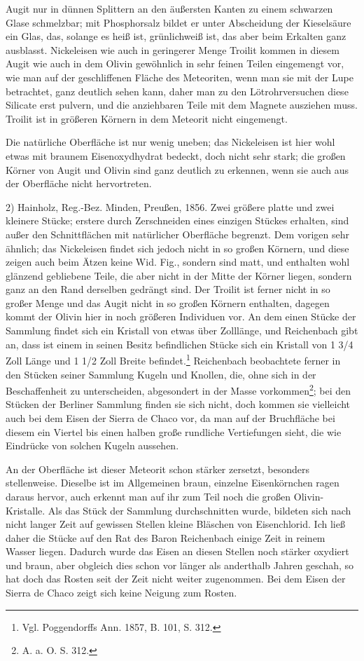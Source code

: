 \documentclass[a4paper, 11pt, oneside]{article}
\begin{document}
Augit nur in dünnen Splittern an den äußersten Kanten zu einem schwarzen Glase schmelzbar; mit Phosphorsalz bildet er unter Abscheidung der Kieselsäure ein Glas, das, solange es heiß ist, grünlichweiß ist, das aber beim Erkalten ganz ausblasst. Nickeleisen wie auch in geringerer Menge Troilit kommen in diesem Augit wie auch in dem Olivin gewöhnlich in sehr feinen Teilen eingemengt vor, wie man auf der geschliffenen Fläche des Meteoriten, wenn man sie mit der Lupe betrachtet, ganz deutlich sehen kann, daher man zu den Lötrohrversuchen diese Silicate erst pulvern, und die anziehbaren Teile mit dem Magnete ausziehen muss. Troilit ist in größeren Körnern in dem Meteorit nicht eingemengt.

Die natürliche Oberfläche ist nur wenig uneben; das Nickeleisen ist hier wohl etwas mit braunem Eisenoxydhydrat bedeckt, doch nicht sehr stark; die großen Körner von Augit und Olivin sind ganz deutlich zu erkennen, wenn sie auch aus der Oberfläche nicht hervortreten.

2) Hainholz, Reg.-Bez. Minden, Preußen, 1856. Zwei größere platte und zwei kleinere Stücke; erstere durch Zerschneiden eines einzigen Stückes erhalten, sind außer den Schnittflächen mit natürlicher Oberfläche begrenzt. Dem vorigen sehr ähnlich; das Nickeleisen findet sich jedoch nicht in so großen Körnern, und diese zeigen auch beim Ätzen keine Wid. Fig., sondern sind matt, und enthalten wohl glänzend gebliebene Teile, die aber nicht in der Mitte der Körner liegen, sondern ganz an den Rand derselben gedrängt sind. Der Troilit ist ferner nicht in so großer Menge und das Augit nicht in so großen Körnern enthalten, dagegen kommt der Olivin hier in noch größeren Individuen vor. An dem einen Stücke der Sammlung findet sich ein Kristall von etwas über Zolllänge, und Reichenbach gibt an, dass ist einem in seinen Besitz befindlichen Stücke sich ein Kristall von 1 3/4 Zoll Länge und 1 1/2 Zoll Breite befindet.\footnote{Vgl. Poggendorffs Ann. 1857, B. 101, S. 312.} Reichenbach beobachtete ferner in den Stücken seiner Sammlung Kugeln und Knollen, die, ohne sich in der Beschaffenheit zu unterscheiden, abgesondert in der Masse vorkommen\footnote{A. a. O. S. 312.}; bei den Stücken der Berliner Sammlung finden sie sich nicht, doch kommen sie vielleicht auch bei dem Eisen der Sierra de Chaco vor, da man auf der Bruchfläche bei diesem ein Viertel bis einen halben große rundliche Vertiefungen sieht, die wie Eindrücke von solchen Kugeln aussehen.

An der Oberfläche ist dieser Meteorit schon stärker zersetzt, besonders stellenweise. Dieselbe ist im Allgemeinen braun, einzelne Eisenkörnchen ragen daraus hervor, auch erkennt man auf ihr zum Teil noch die großen Olivin-Kristalle. Als das Stück der Sammlung durchschnitten wurde, bildeten sich nach nicht langer Zeit auf gewissen Stellen kleine Bläschen von Eisenchlorid. Ich ließ daher die Stücke auf den Rat des Baron Reichenbach einige Zeit in reinem Wasser liegen. Dadurch wurde das Eisen an diesen Stellen noch stärker oxydiert und braun, aber obgleich dies schon vor länger als anderthalb Jahren geschah, so hat doch das Rosten seit der Zeit nicht weiter zugenommen. Bei dem Eisen der Sierra de Chaco zeigt sich keine Neigung zum Rosten.
\clearpage
\end{document}
